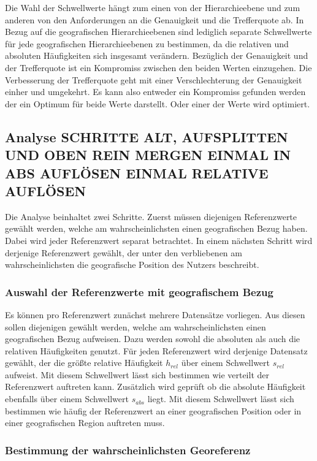 				Die Wahl der Schwellwerte hängt zum einen von der Hierarchieebene und zum anderen von den Anforderungen an die Genauigkeit und die Trefferquote ab.
				In Bezug auf die geografischen Hierarchieebenen sind lediglich separate Schwellwerte für jede geografischen Hierarchieebenen zu bestimmen, da die relativen und absoluten Häufigkeiten sich insgesamt verändern.
				Bezüglich der Genauigkeit und der Trefferquote ist ein Kompromiss zwischen den beiden Werten einzugehen. 
				Die Verbesserung der Trefferquote geht mit einer Verschlechterung der Genauigkeit einher und umgekehrt.
				Es kann also entweder ein Kompromiss gefunden werden der ein Optimum für beide Werte darstellt. 
				Oder einer der Werte wird optimiert.  

	\subsection{Analyse SCHRITTE ALT, AUFSPLITTEN UND OBEN REIN MERGEN EINMAL IN ABS AUFLÖSEN EINMAL RELATIVE AUFLÖSEN}

			Die Analyse beinhaltet zwei Schritte. 
			Zuerst müssen diejenigen Referenzwerte gewählt werden, welche am wahrscheinlichsten einen geografischen Bezug haben.
			Dabei wird jeder Referenzwert separat betrachtet. 
			In einem nächsten Schritt wird derjenige Referenzwert gewählt, der unter den verbliebenen am wahrscheinlichsten die geografische Position des Nutzers beschreibt. 

			\subsubsection{Auswahl der Referenzwerte mit geografischem Bezug}

				Es können pro Referenzwert zunächst mehrere Datensätze vorliegen.
				Aus diesen sollen diejenigen gewählt werden, welche am wahrscheinlichsten einen geografischen Bezug aufweisen.
				Dazu werden sowohl die absoluten als auch die relativen Häufigkeiten genutzt. 
				Für jeden Referenzwert wird derjenige Datensatz gewählt, der die größte relative Häufigkeit $h_{rel}$ über einem Schwellwert $s_{rel}$ aufweist.
				Mit diesem Schwellwert lässt sich bestimmen wie verteilt der Referenzwert auftreten kann.
				Zusätzlich wird geprüft ob die absolute Häufigkeit ebenfalls über einem Schwellwert $s_{abs}$ liegt.
				Mit diesem Schwellwert lässt sich bestimmen wie häufig der Referenzwert an einer geografischen Position oder in einer geografischen Region auftreten muss. 

			\subsubsection{Bestimmung der wahrscheinlichsten Georeferenz} 

